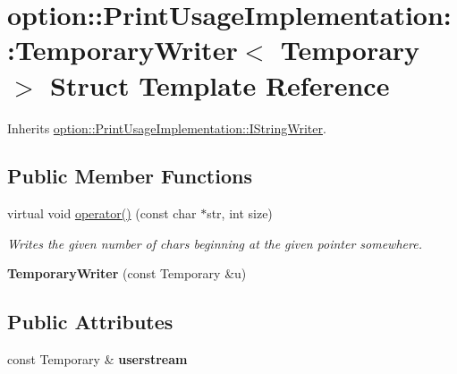 \hypertarget{structoption_1_1_print_usage_implementation_1_1_temporary_writer}{\section{option\-:\-:\-Print\-Usage\-Implementation\-:\-:\-Temporary\-Writer$<$ \-Temporary $>$ \-Struct \-Template \-Reference}
\label{structoption_1_1_print_usage_implementation_1_1_temporary_writer}
}


\-Inherits \hyperlink{structoption_1_1_print_usage_implementation_1_1_i_string_writer}{option\-::\-Print\-Usage\-Implementation\-::\-I\-String\-Writer}.

\subsection*{\-Public \-Member \-Functions}
\begin{DoxyCompactItemize}
\item 
\hypertarget{structoption_1_1_print_usage_implementation_1_1_temporary_writer_a674751ddfff63852b36c754878276b02}{virtual void \hyperlink{structoption_1_1_print_usage_implementation_1_1_temporary_writer_a674751ddfff63852b36c754878276b02}{operator()} (const char $\ast$str, int size)}\label{structoption_1_1_print_usage_implementation_1_1_temporary_writer_a674751ddfff63852b36c754878276b02}

\begin{DoxyCompactList}\small\item\em \-Writes the given number of chars beginning at the given pointer somewhere. \end{DoxyCompactList}\item 
\hypertarget{structoption_1_1_print_usage_implementation_1_1_temporary_writer_a0c65740b5a897ca2a2465d1c112882a8}{{\bfseries \-Temporary\-Writer} (const \-Temporary \&u)}\label{structoption_1_1_print_usage_implementation_1_1_temporary_writer_a0c65740b5a897ca2a2465d1c112882a8}

\end{DoxyCompactItemize}
\subsection*{\-Public \-Attributes}
\begin{DoxyCompactItemize}
\item 
\hypertarget{structoption_1_1_print_usage_implementation_1_1_temporary_writer_a91d54cfcea7bb4072072506d46cc2cc8}{const \-Temporary \& {\bfseries userstream}}\label{structoption_1_1_print_usage_implementation_1_1_temporary_writer_a91d54cfcea7bb4072072506d46cc2cc8}

\end{DoxyCompactItemize}
